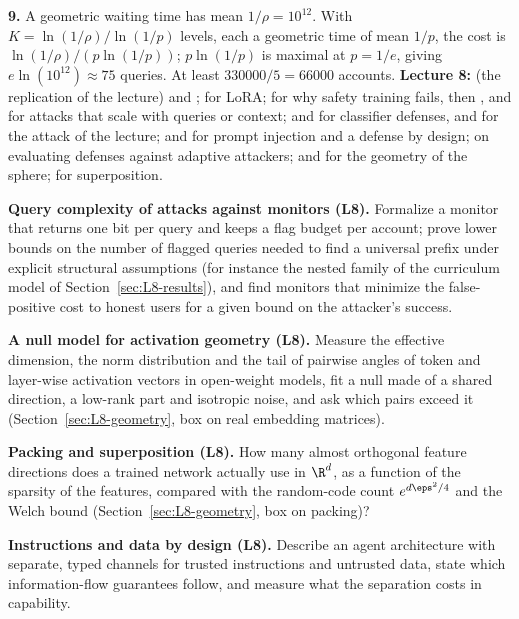\textbf{9.} A geometric waiting time has mean $1/\rho=10^{12}$. With $K=\ln(1/\rho)/\ln(1/p)$ levels, each a geometric time of mean $1/p$, the cost is $\ln(1/\rho)/(p\ln(1/p))$; $p\ln(1/p)$ is maximal at $p=1/e$, giving $e\ln(10^{12})\approx75$ queries. At least $330000/5=66000$ accounts.
\textbf{Lecture 8:} \citet{turner2025} (the replication of the lecture) and \citet{betley2025}; \citet{hu2021lora} for LoRA; \citet{wei2023jailbroken} for why safety training fails, then \citet{zou2023}, \citet{anil2024} and \citet{hughes2024} for attacks that scale with queries or context; \citet{sharma2025} and \citet{cunningham2026} for classifier defenses, and \citet{aisi2026bpj} for the attack of the lecture; \citet{greshake2023} and \citet{debenedetti2025} for prompt injection and a defense by design; \citet{nasr2025} on evaluating defenses against adaptive attackers; \citet{ball1997} and \citet{cai2013} for the geometry of the sphere; \citet{elhage2022} for superposition.
  \item \textbf{Query complexity of attacks against monitors (L8).} Formalize a monitor that returns one bit per query and keeps a flag budget per account; prove lower bounds on the number of flagged queries needed to find a universal prefix under explicit structural assumptions (for instance the nested family of the curriculum model of Section~\ref{sec:L8-results}), and find monitors that minimize the false-positive cost to honest users for a given bound on the attacker's success.
  \item \textbf{A null model for activation geometry (L8).} Measure the effective dimension, the norm distribution and the tail of pairwise angles of token and layer-wise activation vectors in open-weight models, fit a null made of a shared direction, a low-rank part and isotropic noise, and ask which pairs exceed it (Section~\ref{sec:L8-geometry}, box on real embedding matrices).
  \item \textbf{Packing and superposition (L8).} How many almost orthogonal feature directions does a trained network actually use in $\R^d$, as a function of the sparsity of the features, compared with the random-code count $e^{d\eps^2/4}$ and the Welch bound (Section~\ref{sec:L8-geometry}, box on packing)?
  \item \textbf{Instructions and data by design (L8).} Describe an agent architecture with separate, typed channels for trusted instructions and untrusted data, state which information-flow guarantees follow, and measure what the separation costs in capability.
